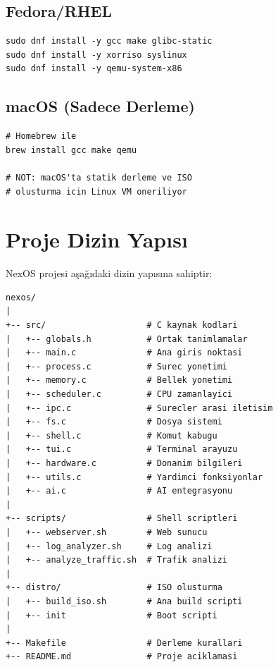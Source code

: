 \documentclass[12pt,a4paper]{report}
\begin{document}
\subsection{Fedora/RHEL}

\begin{lstlisting}[style=bashstyle,caption={Fedora Kurulumu}]
sudo dnf install -y gcc make glibc-static
sudo dnf install -y xorriso syslinux
sudo dnf install -y qemu-system-x86
\end{lstlisting}

\subsection{macOS (Sadece Derleme)}

\begin{lstlisting}[style=bashstyle,caption={macOS Kurulumu}]
# Homebrew ile
brew install gcc make qemu

# NOT: macOS'ta statik derleme ve ISO
# olusturma icin Linux VM oneriliyor
\end{lstlisting}

\section{Proje Dizin Yapısı}

NexOS projesi aşağıdaki dizin yapısına sahiptir:

\begin{lstlisting}[style=bashstyle,caption={Proje Yapisi}]
nexos/
|
+-- src/                    # C kaynak kodlari
|   +-- globals.h           # Ortak tanimlamalar
|   +-- main.c              # Ana giris noktasi
|   +-- process.c           # Surec yonetimi
|   +-- memory.c            # Bellek yonetimi
|   +-- scheduler.c         # CPU zamanlayici
|   +-- ipc.c               # Surecler arasi iletisim
|   +-- fs.c                # Dosya sistemi
|   +-- shell.c             # Komut kabugu
|   +-- tui.c               # Terminal arayuzu
|   +-- hardware.c          # Donanim bilgileri
|   +-- utils.c             # Yardimci fonksiyonlar
|   +-- ai.c                # AI entegrasyonu
|
+-- scripts/                # Shell scriptleri
|   +-- webserver.sh        # Web sunucu
|   +-- log_analyzer.sh     # Log analizi
|   +-- analyze_traffic.sh  # Trafik analizi
|
+-- distro/                 # ISO olusturma
|   +-- build_iso.sh        # Ana build scripti
|   +-- init                # Boot scripti
|
+-- Makefile                # Derleme kurallari
+-- README.md               # Proje aciklamasi
\end{lstlisting}
\end{document}
